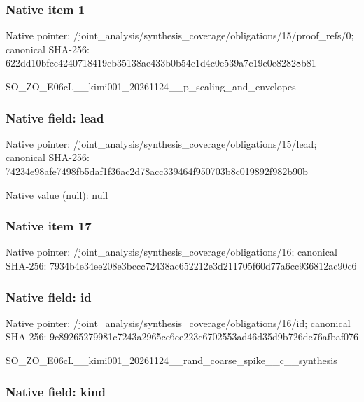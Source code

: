 \documentclass[10pt,a4paper]{article}
\begin{document}
\subsubsection{Native item 1}


Native pointer: /joint\_analysis/synthesi\allowbreak{}s\_coverage/obligations/1\allowbreak{}5/proof\_refs/0; canonical SHA-256: 622dd10bfcc4240718419cb3\allowbreak{}5138ae433b0b54c1d4c0e539\allowbreak{}a7c19e0e82828b81


SO\_ZO\_E06cL\_\_kimi001\_202\allowbreak{}61124\_\_p\_scaling\_and\_env\allowbreak{}elopes


\subsubsection{Native field: lead}


Native pointer: /joint\_analysis/synthesi\allowbreak{}s\_coverage/obligations/1\allowbreak{}5/lead; canonical SHA-256: 74234e98afe7498fb5daf1f3\allowbreak{}6ac2d78acc339464f950703b\allowbreak{}8c019892f982b90b



Native value (null): null



\subsubsection{Native item 17}


Native pointer: /joint\_analysis/synthesi\allowbreak{}s\_coverage/obligations/1\allowbreak{}6; canonical SHA-256: 7934b4e34ee208e3bccc7243\allowbreak{}8ac652212e3d211705f60d77\allowbreak{}a6cc936812ac90c6



\subsubsection{Native field: id}


Native pointer: /joint\_analysis/synthesi\allowbreak{}s\_coverage/obligations/1\allowbreak{}6/id; canonical SHA-256: 9c89265279981c7243a2965c\allowbreak{}e6ce223c6702553ad46d35d9\allowbreak{}b726de76afbaf076


SO\_ZO\_E06cL\_\_kimi001\_202\allowbreak{}61124\_\_rand\_coarse\_spike\allowbreak{}\_\_c\_\_synthesis


\subsubsection{Native field: kind}
\end{document}
